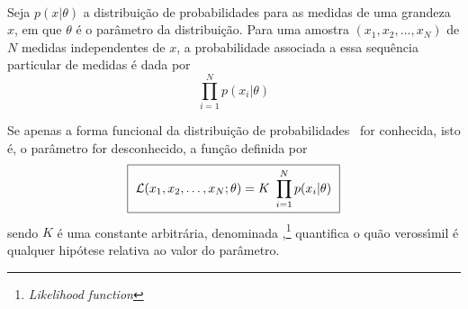 \paragraph*{}
Seja $p(x|\theta)$ a distribui\c{c}\~{a}o de probabilidades  para as medidas de uma gran\-de\-za $x$, em que
$\theta$ \'{e} o par\^{a}metro da distribui\c{c}\~{a}o. Para  uma amostra  $(x_1, x_2, \dots, x_N)$ de $N$ me\-di\-das independentes de $x$, a pro\-ba\-bi\-li\-da\-de associada a es\-sa se\-qu\^{e}n\-cia particular de medidas \'{e}  dada por
$$  \prod_{i=1}^{N} p(x_i|\theta)  $$

%

\vspace{-0.2cm}
Se apenas a forma funcional da distribui\c{c}\~{a}o de probabilidades \apriori\ for conhecida, isto \'{e}, o par\^{a}metro for desconhecido, a  fun\c{c}\~{a}o definida por
%
\begin{equation}
 \label{vero1}
\fbox{~$\displaystyle  {\cal L} (x_1, x_2,  \dots,  x_N; \theta)  = K \ \prod_{i=1}^{N} p(x_i|\theta)
$~}
 \end{equation}
sendo $K$ \'{e} uma constante arbitr\'{a}ria, denominada
 \cite{Fisher},\footnote{{\it Likelihood function}} quantifica o qu\~{a}o veross\'{\i}mil \'{e} qualquer hip\'{o}tese relativa ao valor do par\^{a}metro.

